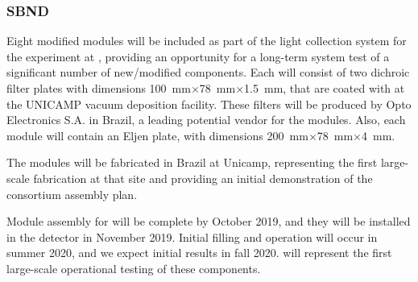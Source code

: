 
\subsubsection{SBND}
\label{sec:valid-sbnd}

Eight modified  modules will be included as part of the light collection system for the  experiment at , providing an opportunity for a long-term system test of a significant number of new/modified components.  Each   will consist of two dichroic filter plates with dimensions
\SI{100}{mm}$\times$\SI{78}{mm}$\times$\SI{1.5}{mm},
 that are coated with  at the UNICAMP vacuum deposition facility.  These filters will be produced by Opto Electronics S.A. in Brazil, a leading potential vendor for the   modules.  Also, each  module will contain an Eljen  plate, 
 with dimensions 
\SI{200}{mm}$\times$\SI{78}{mm}$\times$\SI{4}{mm}.


The   modules will be fabricated in Brazil at Unicamp, representing the first large-scale fabrication at that site and providing an initial demonstration of the   consortium assembly plan.

Module assembly for  will be complete by October 2019, and they will be installed in the detector in November 2019.  Initial filling and operation will occur in summer 2020, and we expect initial results in fall 2020.   will represent the first large-scale operational testing of these components.


